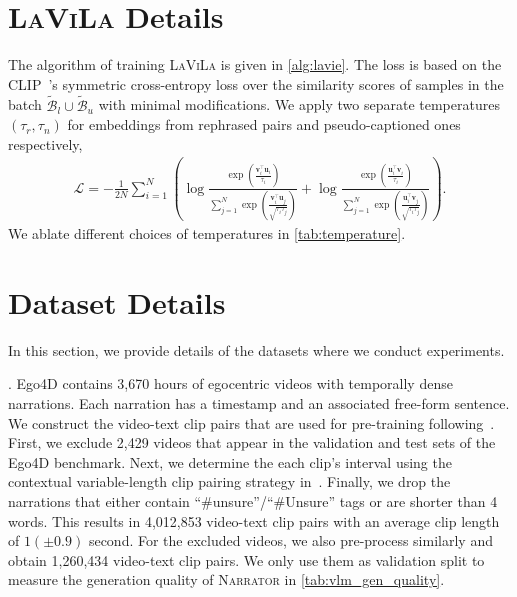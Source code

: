 \documentclass[10pt,twocolumn,letterpaper]{article}
\newcommand{\vu}{\mathbf{u}}
\newcommand{\vv}{\mathbf{v}}
\newcommand{\myparagraph}[1]{\vspace{0pt}\noindent{\bf #1}}
\newcommand{\ours}{\textsc{LaViLa}\xspace}
\newcommand{\narrator}{\textsc{Narrator}\xspace}
\begin{document}
\section{ \bf \ours Details}
\label{sec:appdx:method}

The algorithm of training \ours is given in \cref{alg:lavie}.
The loss is based on the CLIP~\cite{radford2021clip}'s symmetric cross-entropy loss over the similarity scores of samples in the batch $  \mathcal{\widetilde{B}}_l \cup  \mathcal{\widetilde{B}}_u $ with minimal modifications.
We apply two separate temperatures $(\tau_{r}, \tau_{n})$ for embeddings from rephrased pairs and pseudo-captioned ones respectively,
{\small
	\begin{align}
		\label{eq:loss}
		\mathcal{L}= -\frac{1}{2N} \sum_{i=1}^N \left(
		\log{\frac{\exp(\frac{\vv_i^\top\vu_i}{\tau_i})}{\sum\limits_{j=1}^N \exp(\frac{\vv_i^\top\vu_j}{\sqrt{\tau_i\tau_j}})}} + \log{\frac{\exp(\frac{\vu_i^\top\vv_i}{\tau_i})}{\sum\limits_{j=1}^N \exp(\frac{\vu_i^\top\vv_j}{\sqrt{\tau_i\tau_j}})}}
		\right).
	\end{align}
}
We ablate different choices of temperatures in \cref{tab:temperature}.


\section{Dataset Details}\label{sec:appdx:dataset}

In this section, we provide details of the datasets where we conduct experiments.

\myparagraph{Ego4D}.
Ego4D contains 3,670 hours of egocentric videos with temporally dense narrations.
Each narration has a timestamp and an associated free-form sentence.
We construct the video-text clip pairs that are used for pre-training following~\cite{lin2022egovlp}.
First, we exclude 2,429 videos that appear in the validation and test sets of the Ego4D benchmark.
Next, we determine the each clip's interval using the contextual variable-length clip pairing strategy in~\cite{lin2022egovlp}.
Finally, we drop the narrations that either contain ``\#unsure''/``\#Unsure'' tags or are shorter than 4 words.
This results in 4,012,853 video-text clip pairs with an average clip length of $1 (\pm0.9)$ second.
For the excluded videos, we also pre-process similarly and obtain 1,260,434 video-text clip pairs.
We only use them as validation split to measure the generation quality of \narrator in \cref{tab:vlm_gen_quality}.
\end{document}
